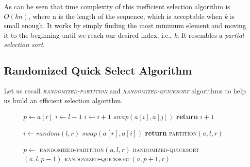 
As can be seen  that time complexity of this inefficient selection algorithm is $O(kn)$, where n is the length of the sequence, which is acceptable when \emph{k} is small enough. It works by simply finding the most minimum element and moving it to the beginning until we reach our desired index, i.e., \emph{k}. It resembles a \emph{partial selection sort}.

\subsection*{Randomized Quick Select Algorithm}
Let us recall \emph{\textsc{randomized-partition}} and \emph{\textsc{randomized-quicksort}} algorithms to help us build an efficient selection algorithm. 
\begin{figure}[H]
\begin{center}
\end{center}
\begin{algorithmic}[1]
    \State $p\gets a[r]$
    \State $i \gets l - 1$
            \State $i \gets i + 1$
            \State $swap(a[i], a[j])$
        \EndIf
    \EndFor
    \State \textbf{return} $i + 1$
\EndFunction
\end{algorithmic}
\end{figure}

\begin{figure}[H]
\begin{center}
\end{center}
\begin{algorithmic}[1]
    \State $i \gets random(l, r)$
    \State $swap(a[r], a[i])$  
  \State \textbf{return} \textsc{partition}$(a, l, r)$
\EndFunction
\end{algorithmic}
\end{figure}

\begin{figure}[H]
\begin{center}
\end{center}
\begin{algorithmic}[1]
    \State $p \gets$ \textsc{randomized-partition}$(a, l, r)$
    \State \textsc{randomized-quicksort}$(a, l, p - 1)$
    \State \textsc{randomized-quicksort}$(a, p + 1, r)$  
\EndFunction
\end{algorithmic}
\end{figure}

